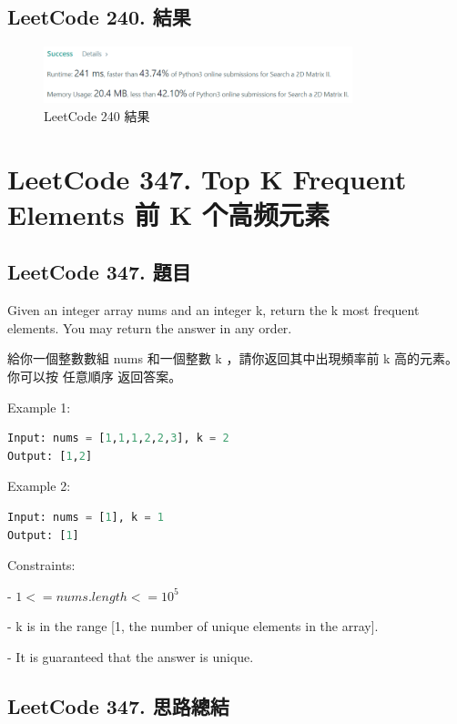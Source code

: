 \documentclass[10pt,UTF8]{ctexart}
\begin{document}
\subsection{LeetCode 240. 結果}

\begin{figure}[H]
\centering 
\includegraphics[width=0.80\textwidth]{lc-240-o.png} 
\caption{LeetCode 240 結果}
\label{Test}
\end{figure}


\newpage

\section{LeetCode 347. Top K Frequent Elements 前 K 个高频元素}

\subsection{LeetCode 347. 題目}

Given an integer array nums and an integer k, return the k most frequent elements. You may return the answer in any order.

給你一個整數數組 nums 和一個整數 k ，請你返回其中出現頻率前 k 高的元素。你可以按 任意順序 返回答案。

Example 1:

\begin{lstlisting}[language={python}]
Input: nums = [1,1,1,2,2,3], k = 2
Output: [1,2]
\end{lstlisting}

Example 2:

\begin{lstlisting}[language={python}]
Input: nums = [1], k = 1
Output: [1]
\end{lstlisting}

Constraints:

- $1 <= nums.length <= 10^{5}$

- k is in the range [1, the number of unique elements in the array].

- It is guaranteed that the answer is unique.


\subsection{LeetCode 347. 思路總結}
\end{document}
